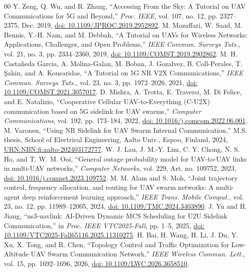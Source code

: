 \begin{thebibliography}{00}
 Y. Zeng, Q. Wu, and R. Zhang, ``Accessing From the Sky: A Tutorial on UAV Communications for 5G and Beyond,'' \emph{Proc. IEEE}, vol. 107, no. 12, pp. 2327--2375, Dec. 2019, \href{https://doi.org/10.1109/JPROC.2019.2952892}{doi: 10.1109/JPROC.2019.2952892}.
 M. Mozaffari, W. Saad, M. Bennis, Y.-H. Nam, and M. Debbah, ``A Tutorial on UAVs for Wireless Networks: Applications, Challenges, and Open Problems,'' \emph{IEEE Commun. Surveys Tuts.}, vol. 21, no. 3, pp. 2334--2360, 2019, \href{https://doi.org/10.1109/COMST.2019.2902862}{doi: 10.1109/COMST.2019.2902862}.
 M. H. Casta\~neda Garcia, A. Molina-Galan, M. Boban, J. Gozalvez, B. Coll-Perales, T. \c{S}ahin, and A. Kousaridas, ``A Tutorial on 5G NR V2X Communications,'' \emph{IEEE Commun. Surveys Tuts.}, vol. 23, no. 3, pp. 1972--2026, 2021, \href{https://doi.org/10.1109/COMST.2021.3057017}{doi: 10.1109/COMST.2021.3057017}.
 D. Mishra, A. Trotta, E. Traversi, M. Di Felice, and E. Natalizio, ``Cooperative Cellular UAV-to-Everything (C-U2X) communication based on 5G sidelink for UAV swarms,'' \emph{Computer Communications}, vol. 192, pp. 173--184, 2022, \href{https://doi.org/10.1016/j.comcom.2022.06.001}{doi: 10.1016/j.comcom.2022.06.001}.
 M. Varonen, ``Using NR Sidelink for UAV Swarm Internal Communication,'' M.S. thesis, School of Electrical Engineering, Aalto Univ., Espoo, Finland, 2024, \href{https://urn.fi/URN:NBN:fi:aalto-202403172777}{URN:NBN:fi:aalto-202403172777}.
 W. J. Lau, J. M.-Y. Lim, C. Y. Chong, N. S. Ho, and T. W. M. Ooi, ``General outage probability model for UAV-to-UAV links in multi-UAV networks,'' \emph{Computer Networks}, vol. 229, Art. no. 109752, 2023, \href{https://doi.org/10.1016/j.comnet.2023.109752}{doi: 10.1016/j.comnet.2023.109752}.
 M. M. Alam and S. Moh, ``Joint trajectory control, frequency allocation, and routing for UAV swarm networks: A multi-agent deep reinforcement learning approach,'' \emph{IEEE Trans. Mobile Comput.}, vol. 23, no. 12, pp. 11989--12005, 2024, \href{https://doi.org/10.1109/TMC.2024.3403890}{doi: 10.1109/TMC.2024.3403890}.
 J. Yu and H. Jiang, ``ns3-uavlink: AI-Driven Dynamic MCS Scheduling for U2U Sidelink Communication,'' in \emph{Proc. IEEE VTC2025-Fall}, pp. 1--5, 2025, \href{https://doi.org/10.1109/VTC2025-Fall65116.2025.11310275}{doi: 10.1109/VTC2025-Fall65116.2025.11310275}.
 H. Bai, H. Wang, H. Li, J. Du, Y. Xu, X. Tong, and R. Chen, ``Topology Control and Traffic Optimization for Low-Altitude UAV Swarm Communication Network,'' \emph{IEEE Wireless Commun. Lett.}, vol. 15, pp. 1692--1696, 2026, \href{https://doi.org/10.1109/LWC.2026.3658510}{doi: 10.1109/LWC.2026.3658510}.

\end{thebibliography}
